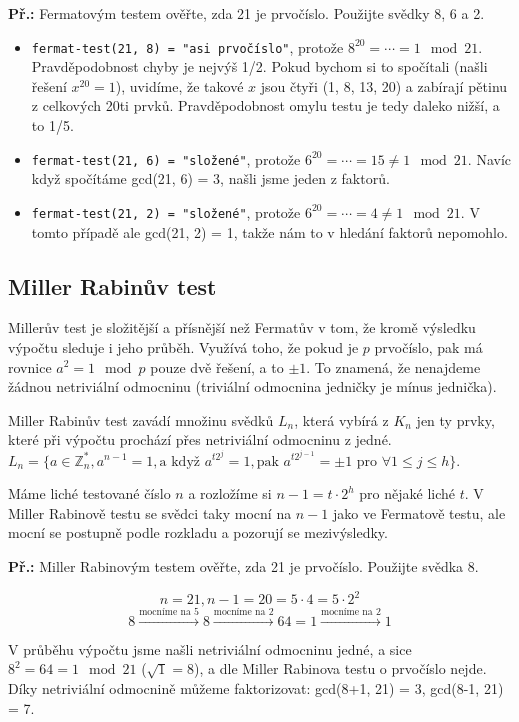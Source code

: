 \documentclass[10pt,a4paper]{article}
\begin{document}
\begin{exercise}
\textbf{Př.:} Fermatovým testem ověřte, zda 21 je prvočíslo. Použijte svědky 8,
6 a 2.
\begin{itemize}
\item \texttt{fermat-test(21, 8) = "asi prvočíslo"}, protože $8^{20} = \cdots =
1 \mod 21$.  Pravděpodobnost chyby je nejvýš 1/2. Pokud bychom si to spočítali
(našli řešení $x^{20} = 1$), uvidíme, že takové $x$ jsou čtyři (1, 8, 13, 20) a
zabírají pětinu z celkových 20ti prvků. Pravděpodobnost omylu testu je tedy
daleko nižší, a to 1/5.
\item \texttt{fermat-test(21, 6) = "složené"}, protože $6^{20} = \cdots = 15
\neq 1 \mod 21$. Navíc když spočítáme gcd(21, 6) = 3, našli jsme jeden z
faktorů.
\item \texttt{fermat-test(21, 2) = "složené"}, protože $6^{20} = \cdots = 4\neq
1 \mod 21$. V tomto případě ale gcd(21, 2) = 1, takže nám to v hledání faktorů
nepomohlo.
\end{itemize}
\end{exercise}

\subsection{Miller Rabinův test}
Millerův test je složitější a přísnější než Fermatův v tom, že kromě výsledku
výpočtu sleduje i jeho průběh. Využívá toho, že pokud je $p$ prvočíslo, pak má
rovnice $a^2 = 1 \mod p$ pouze dvě řešení, a to $\pm 1$. To znamená, že
nenajdeme žádnou netriviální odmocninu (triviální odmocnina jedničky je mínus
jednička).

Miller Rabinův test zavádí množinu svědků $L_n$, která vybírá z $K_n$ jen ty
prvky, které při výpočtu prochází přes netriviální odmocninu z jedné. $L_n = \{a
\in \mathbb{Z}_n^*, a^{n-1} = 1, \text{a když } a^{t2^j} = 1, \text{pak }
a^{t2^{j-1}} = \pm 1 \text{ pro } \forall 1 \leq j \leq h \}$.

Máme liché testované číslo $n$ a rozložíme si $n-1 = t \cdot 2^h$ pro nějaké
liché $t$. V Miller Rabinově testu se svědci taky mocní na $n-1$ jako ve
Fermatově testu, ale mocní se postupně podle rozkladu a pozorují se
mezivýsledky.

\begin{exercise}
\textbf{Př.:} Miller Rabinovým testem ověřte, zda 21 je prvočíslo. Použijte
svědka 8.

$$n = 21, n-1 = 20 = 5 \cdot 4  = 5 \cdot 2^2$$
$$ 8 \xrightarrow{\text{mocníme na 5}} 8 \xrightarrow{\text{mocníme na 2}} 64 =
1 \xrightarrow{\text{mocníme na 2}} 1$$

V průběhu výpočtu jsme našli netriviální odmocninu jedné, a sice $8^2 = 64 = 1
\mod 21$ ($\sqrt{1} = 8$), a dle Miller Rabinova testu o prvočíslo nejde. Díky
netriviální odmocnině můžeme faktorizovat: gcd(8+1, 21) = 3, gcd(8-1, 21) = 7.
\end{exercise}
\end{document}
